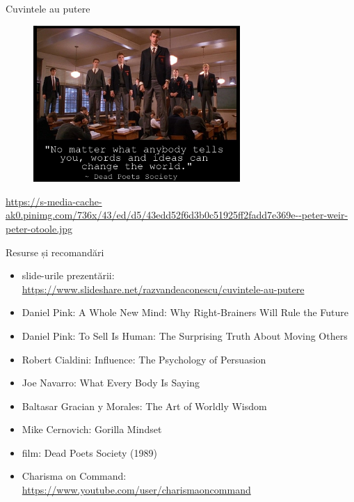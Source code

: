 \documentclass{simple}
\begin{document}
\begin{frame}{Cuvintele au putere}
  \begin{figure}
    \centering
    \includegraphics[width=0.7\textwidth]{img/dead-poets-society-words-change}
  \end{figure}
  \begin{center}
    \tiny
    \url{https://s-media-cache-ak0.pinimg.com/736x/43/ed/d5/43edd52f6d3b0c51925ff2fadd7e369e--peter-weir-peter-otoole.jpg}
  \end{center}
\end{frame}

\begin{frame}{Resurse și recomandări}
  \begin{itemize}
    \item slide-urile prezentării: \url{https://www.slideshare.net/razvandeaconescu/cuvintele-au-putere}
    \item Daniel Pink: A Whole New Mind: Why Right-Brainers Will Rule the Future
    \item Daniel Pink: To Sell Is Human: The Surprising Truth About Moving Others
    \item Robert Cialdini: Influence: The Psychology of Persuasion
    \item Joe Navarro: What Every Body Is Saying
    \item Baltasar Gracian y Morales: The Art of Worldly Wisdom
    \item Mike Cernovich: Gorilla Mindset
    \item film: Dead Poets Society (1989)
    \item Charisma on Command: \url{https://www.youtube.com/user/charismaoncommand}
  \end{itemize}
\end{frame}
\end{document}

